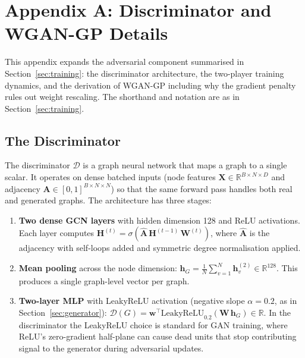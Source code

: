 \documentclass[12pt,a4paper]{article}
\begin{document}
\appendix

\label{app:discriminator}
\section*{Appendix A: Discriminator and WGAN-GP Details}

This appendix expands the adversarial component summarised in Section~\ref{sec:training}: the discriminator architecture, the two-player training dynamics, and the derivation of WGAN-GP including why the gradient penalty rules out weight rescaling. The shorthand and notation are as in Section~\ref{sec:training}.

\subsection{The Discriminator}

The discriminator $\mathcal{D}$ is a graph neural network that maps a graph to a single scalar. It operates on dense batched inputs (node features $\mathbf{X} \in \mathbb{R}^{B \times N \times D}$ and adjacency $\mathbf{A} \in [0,1]^{B \times N \times N}$) so that the same forward pass handles both real and generated graphs. The architecture has three stages:

\begin{enumerate}[nosep]
  \item \textbf{Two dense GCN layers} with hidden dimension 128 and ReLU activations. Each layer computes $\mathbf{H}^{(t)} = \sigma(\hat{\mathbf{A}}\,\mathbf{H}^{(t-1)}\,\mathbf{W}^{(t)})$, where $\hat{\mathbf{A}}$ is the adjacency with self-loops added and symmetric degree normalisation applied.
  \item \textbf{Mean pooling} across the node dimension: $\mathbf{h}_G = \frac{1}{N} \sum_{v=1}^{N} \mathbf{h}_v^{(2)} \in \mathbb{R}^{128}$. This produces a single graph-level vector per graph.
  \item \textbf{Two-layer MLP} with LeakyReLU activation (negative slope $\alpha = 0.2$, as in Section~\ref{sec:generator}): $\mathcal{D}(G) = \mathbf{w}^\top \text{LeakyReLU}_{0.2}(\mathbf{W}\,\mathbf{h}_G) \in \mathbb{R}$. In the discriminator the LeakyReLU choice is standard for GAN training, where ReLU's zero-gradient half-plane can cause dead units that stop contributing signal to the generator during adversarial updates.
\end{enumerate}
\end{document}
